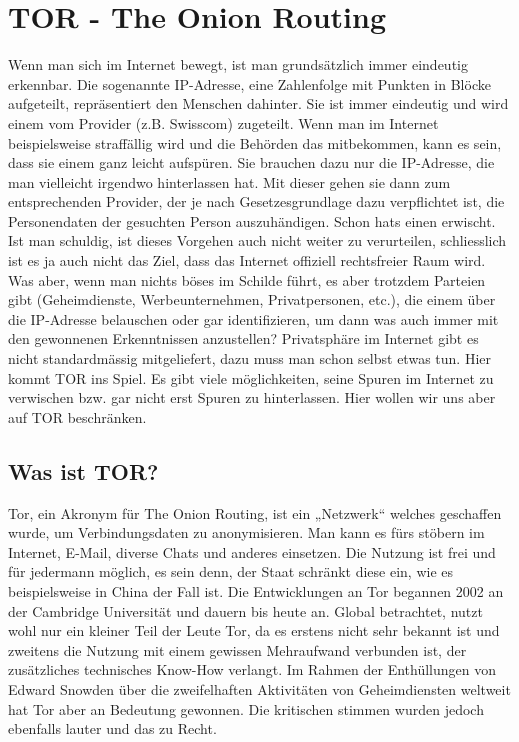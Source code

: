 \newpage
\section{TOR - The Onion Routing}
Wenn man sich im Internet bewegt, ist man grundsätzlich immer eindeutig erkennbar. Die sogenannte IP-Adresse, eine Zahlenfolge mit Punkten in Blöcke aufgeteilt, repräsentiert den Menschen dahinter. Sie ist immer eindeutig und wird einem vom Provider (z.B. Swisscom) zugeteilt. Wenn man im Internet beispielsweise straffällig wird und die Behörden das mitbekommen, kann es sein, dass sie einem ganz leicht aufspüren. Sie brauchen dazu nur die IP-Adresse, die man vielleicht irgendwo hinterlassen hat. Mit dieser gehen sie dann zum entsprechenden Provider, der je nach Gesetzesgrundlage dazu verpflichtet ist, die Personendaten der gesuchten Person auszuhändigen. Schon hats einen erwischt. Ist man schuldig, ist dieses Vorgehen auch nicht weiter zu verurteilen, schliesslich ist es ja auch nicht das Ziel, dass das Internet offiziell rechtsfreier Raum wird. Was aber, wenn man nichts böses im Schilde führt, es aber trotzdem Parteien gibt (Geheimdienste, Werbeunternehmen, Privatpersonen, etc.), die einem über die IP-Adresse belauschen oder gar identifizieren, um dann was auch immer mit den gewonnenen Erkenntnissen anzustellen? Privatsphäre im Internet gibt es nicht standardmässig mitgeliefert, dazu muss man schon selbst etwas tun. Hier kommt TOR ins Spiel. Es gibt viele möglichkeiten, seine Spuren im Internet zu verwischen bzw. gar nicht erst Spuren zu hinterlassen. Hier wollen wir uns aber auf TOR beschränken.

\subsection{Was ist TOR?}
Tor, ein Akronym für The Onion Routing, ist ein „Netzwerk“ welches geschaffen wurde, um Verbindungsdaten zu anonymisieren. Man kann es fürs stöbern im Internet, E-Mail, diverse Chats und anderes einsetzen. Die Nutzung ist frei und für jedermann möglich, es sein denn, der Staat schränkt diese ein, wie es beispielsweise in China der Fall ist. Die Entwicklungen an Tor begannen 2002 an der Cambridge Universität und dauern bis heute an. Global betrachtet, nutzt wohl nur ein kleiner Teil der Leute Tor, da es erstens nicht sehr bekannt ist und zweitens die Nutzung mit einem gewissen Mehraufwand verbunden ist, der zusätzliches technisches Know-How verlangt. Im Rahmen der Enthüllungen von Edward Snowden über die zweifelhaften Aktivitäten von Geheimdiensten weltweit hat Tor aber an Bedeutung gewonnen. Die kritischen stimmen wurden jedoch ebenfalls lauter und das zu Recht.

